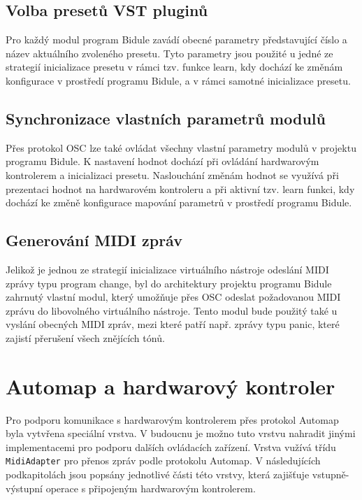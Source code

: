 \documentclass[thesis=M,czech]{FITthesis}[2019/03/06]
\begin{document}
		\subsection{Volba presetů VST pluginů}
		Pro každý modul program Bidule zavádí obecné parametry představující číslo a název aktuálního zvoleného presetu.
		Tyto parametry jsou použité u jedné ze strategií inicializace presetu v rámci tzv. funkce learn, kdy dochází
		ke změnám konfigurace v prostředí programu Bidule, a v rámci samotné inicializace presetu.

		\subsection{Synchronizace vlastních parametrů modulů}
		Přes protokol OSC lze také ovládat všechny vlastní parametry modulů v projektu programu Bidule.
		K nastavení hodnot dochází při ovládání hardwarovým kontrolerem a inicializaci presetu.
		Naslouchání změnám hodnot se využívá při prezentaci hodnot na hardwarovém kontroleru
		a při aktivní tzv. learn funkci, kdy dochází ke změně konfigurace mapování parametrů v prostředí programu Bidule.

		\subsection{Generování MIDI zpráv}
		Jelikož je jednou ze strategií inicializace virtuálního nástroje odeslání MIDI zprávy typu program change,
		byl do architektury projektu programu Bidule zahrnutý vlastní modul, který umožňuje přes OSC odeslat požadovanou MIDI zprávu
		do libovolného virtuálního nástroje. Tento modul bude použitý také u vyslání obecných MIDI zpráv,
		mezi které patří např. zprávy typu panic, které zajistí přerušení všech znějících tónů.
	
	\section{Automap a hardwarový kontroler}\label{sec:automap-hw-controller}
		Pro podporu komunikace s hardwarovým kontrolerem přes protokol Automap byla vytvřena speciální vrstva.
		V budoucnu je možno tuto vrstvu nahradit jinými implementacemi pro podporu dalších ovládacích zařízení.
		Vrstva vužívá třídu \texttt{MidiAdapter} pro přenos zpráv podle protokolu Automap.
		V následujících podkapitolách jsou popsány jednotlivé části této vrstvy, která zajišťuje
		vstupně-výstupní operace s připojeným hardwarovým kontrolerem. 
\end{document}
